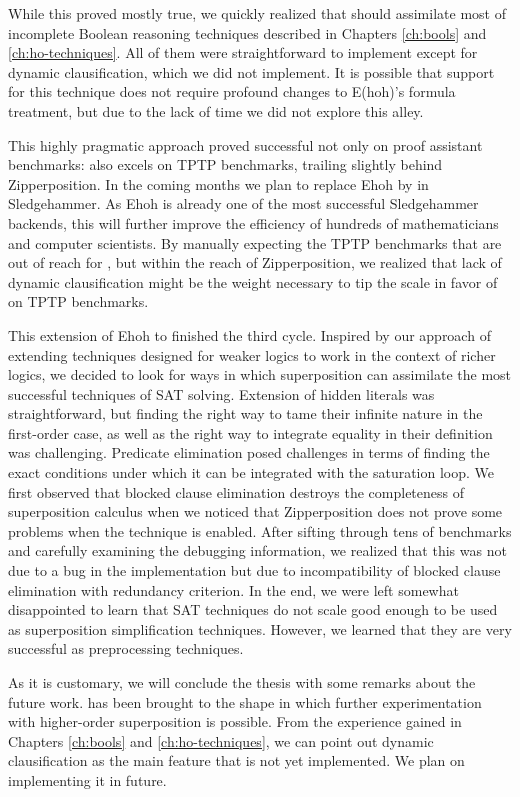 While this proved mostly true, we quickly realized that \ehohii{} should
assimilate most of incomplete Boolean reasoning techniques described in Chapters
\ref{ch:bools} and \ref{ch:ho-techniques}. All of them were straightforward to
implement except for dynamic clausification, which we did not implement. It is
possible that support for this technique does not require profound changes to
E(hoh)'s formula treatment, but due to the lack of time we did not explore this
alley.

This highly pragmatic approach proved successful not only on proof assistant
benchmarks: \ehohii{} also excels on TPTP benchmarks, trailing slightly behind
Zipperposition. In the coming months we plan to replace Ehoh by \ehohii{} in Sledgehammer.
As Ehoh is already one of the most successful Sledgehammer backends,
this will further improve the efficiency of hundreds of mathematicians and computer scientists.
By manually expecting the TPTP benchmarks that are out of reach
for \ehohii{}, but within the reach of Zipperposition, we realized that lack of
dynamic clausification might be the weight necessary to tip the scale in
favor of \ehohii{} on TPTP benchmarks. 

This extension of Ehoh to \ehohii{} finished the third cycle. Inspired by our
approach of extending techniques designed for weaker logics to work in the
context of richer logics, we decided to look for ways in which superposition can
assimilate the most successful techniques of SAT solving. Extension of hidden
literals was straightforward, but finding the right way to tame their infinite
nature in the first-order case, as well as the right way to integrate equality
in their definition was challenging. Predicate elimination posed challenges in
terms of finding the exact conditions under which it can be integrated with the
saturation loop. We first observed that blocked clause elimination destroys the
completeness of superposition calculus when we noticed that Zipperposition does
not prove some problems when the technique is enabled. After sifting through tens of
benchmarks and carefully examining the debugging information, we realized that
this was not due to a bug in the implementation but due to incompatibility of
blocked clause elimination with redundancy criterion. In the end, we were left
somewhat disappointed to learn that SAT techniques do not scale good enough to be used
as superposition simplification techniques. However, we learned that they are
very successful as preprocessing techniques.

As it is customary, we will conclude the thesis with some remarks about the
future work. \ehohii{} has been brought to the shape in which further
experimentation with higher-order superposition is possible. From the experience
gained in Chapters \ref{ch:bools} and \ref{ch:ho-techniques}, we can point out
dynamic clausification as the main feature that is not yet implemented. We plan
on implementing it in future.


